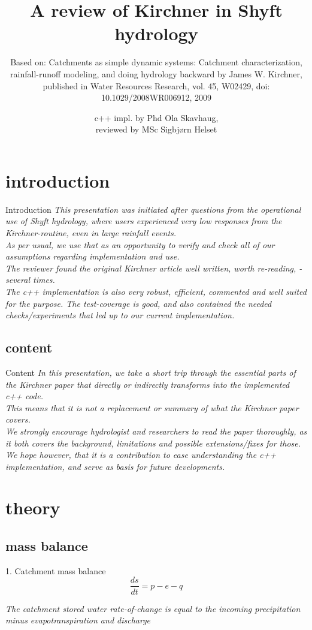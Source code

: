 \documentclass{beamer}
\title{A review of Kirchner in Shyft hydrology}
\subtitle{Based on: Catchments as simple dynamic systems: Catchment characterization, rainfall-runoff modeling, and doing hydrology backward by James W. Kirchner, published in Water Resources Research, vol. 45, W02429, doi: 10.1029/2008WR006912, 2009}
\author[]{c++ impl. by Phd Ola Skavhaug, \\
	reviewed by MSc Sigbjørn Helset}
\begin{document}
\begin{frame}[plain]
    \maketitle
\end{frame}
\section{introduction}
\begin{frame}{Introduction}
	\emph{This presentation was initiated after questions from the operational use of Shyft hydrology, where users experienced very low responses from the Kirchner-routine, even in large rainfall events. \\
	As per usual, we use that as an opportunity to verify and check all of our assumptions regarding implementation and use.\\
	 The reviewer found the original Kirchner article well written, worth re-reading, -several times.\\
	 The c++ implementation is also very robust, efficient, commented and well suited for the purpose. The test-coverage is good, and also contained the needed checks/experiments that led up to our current implementation.}
\end{frame}
\subsection{content}
\begin{frame}{Content}
	\emph{In this presentation, we take a short trip through the essential parts of the Kirchner paper that directly or indirectly transforms into the implemented c++ code.\\
		 This means that it is not a replacement or summary of what the Kirchner paper covers.\\
		 We strongly encourage hydrologist and researchers to read the paper thoroughly, as it both covers the background, limitations and possible extensions/fixes for those. We hope however, that it is a contribution to ease understanding the c++ implementation, and serve as basis for future developments. }
\end{frame}
\section{theory}
\subsection{mass balance}
\begin{frame}{1. Catchment mass balance}
		\begin{equation}
		\dfrac{ds}{dt} = p -e -q 
		\end{equation}
	
	\emph{The catchment stored water rate-of-change is equal to the incoming precipitation minus evapotranspiration and discharge}\\
	
\end{frame}
\end{document}
